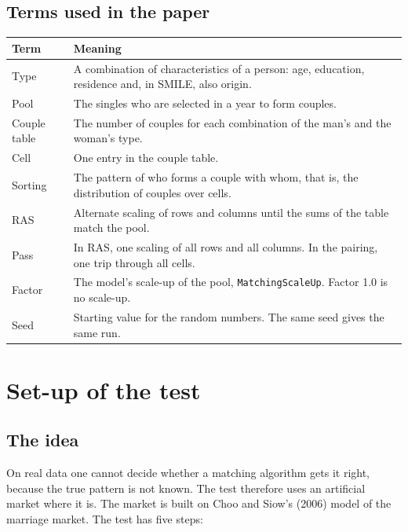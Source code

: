 \documentclass[12pt,a4paper]{article}
\newcommand{\kode}[1]{\texttt{#1}}
\begin{document}
\subsection{Terms used in the paper}

\begin{longtable}{@{}lp{11.3cm}@{}}
\toprule
Term & Meaning \\
\midrule
\endhead
Type & A combination of characteristics of a person: age, education, residence and, in SMILE, also origin. \\
Pool & The singles who are selected in a year to form couples. \\
Couple table & The number of couples for each combination of the man's and the woman's type. \\
Cell & One entry in the couple table. \\
Sorting & The pattern of who forms a couple with whom, that is, the distribution of couples over cells. \\
RAS & Alternate scaling of rows and columns until the sums of the table match the pool. \\
Pass & In RAS, one scaling of all rows and all columns. In the pairing, one trip through all cells. \\
Factor & The model's scale-up of the pool, \kode{MatchingScaleUp}. Factor 1.0 is no scale-up. \\
Seed & Starting value for the random numbers. The same seed gives the same run. \\
\bottomrule
\end{longtable}
\addtocounter{table}{-1}%


\section{Set-up of the test}\label{sec:opstilling}

\subsection{The idea}

On real data one cannot decide whether a matching algorithm gets it right, because the true pattern
is not known. The test therefore uses an artificial market where it is. The market is built on
Choo and Siow's (2006) model of the marriage market. The test has five steps:
\end{document}
